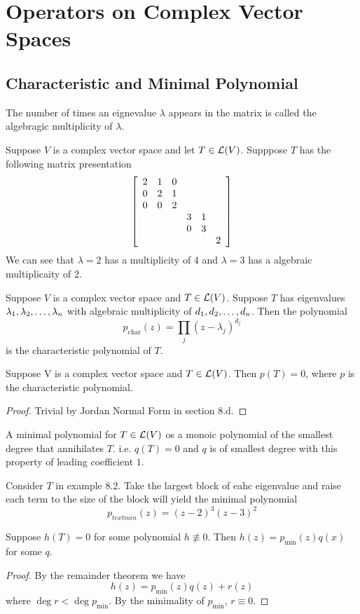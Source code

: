 \section{Operators on Complex Vector Spaces}
\setcounter{subsection}{2}
\subsection{Characteristic and Minimal Polynomial}
\begin{definition}
	The number of times an eignevalue $\lambda$ appears in the matrix is called the algebragic multiplicity of $\lambda$.
\end{definition}
\begin{example}
	Suppose $V$ is a complex vector space and let $T \in \mathcal L(V)$. Supppose $T$ has the following matrix presentation
\[ \left[ \begin{array}{ccccccccccccccccccccccccccccccccccccccccccccccccccccccccccc} 
	2 & 1 & 0 \\
	0 & 2 & 1 \\
	0 & 0 & 2 \\
	&&& 3 & 1 \\
	&&& 0 & 3 \\
	&&&&& 2	\end{array} \right]\]
	We can see that $\lambda = 2$ has a multiplicity of $4$ and $\lambda = 3$ has a algebraic multiplicaity of $2$.
\end{example}
\begin{definition}
	Suppose $V$ is a complex vector space and $T \in \mathcal L(V)$. Suppose $T$ has eigenvalues ${\lambda}_1,{\lambda}_2, \ldots, {\lambda}_{n}$ with algebraic multiplicity of ${d}_1,{d}_2, \ldots, {d}_{n}$. Then the polynomial
	\[ p_{\text{char}}(z) = \prod_{j} (z - \lambda_j)^{d_j} \] is the characteristic polynomial of $T$.
\end{definition}
\begin{theorem}
	Suppose V is a complex vector space and $T \in \mathcal L(V)$. Then $p(T) = 0$, where $p$ is the characteristic polynomial. 
\end{theorem}
\begin{proof}
	Trivial by Jordan Normal Form in section 8.d.
\end{proof}	
\begin{definition}
	A minimal polynomial for $T \in \mathcal L(V)$ os a monoic polynomial of the smallest degree that annihilates $T$. i.e. $q(T) = 0$ and $q$ is of smallest degree with this property of leading coefficient $1$.
\end{definition}
\begin{example}
	Consider $T$ in example 8.2. Take the largest block of eahc eigenvalue and raise each term to the size of the block will yield the minimal polynomial
	\[ p_{text{min}} (z) = (z - 2)^3(z - 3)^2\]
\end{example}
\begin{corollary}
	Suppose $h(T) = 0$ for some polynomial $h \not\equiv 0$. Then $h(z) = p_{\text{min}} (z)q(x)$ for some $q$.
\end{corollary}
\begin{proof}
	By the remainder theorem we have 
	\[ h(z) = p_{\text{min}}(z)q(z) + r(z)\]
	where $\deg r < \deg p_{\text{min}}$. By the minimality of $p_{\text{min}}$, $r \equiv 0$.
\end{proof}
